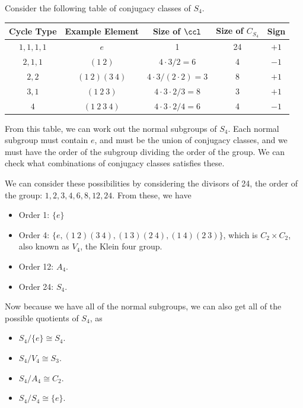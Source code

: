 \documentclass[a4]{scrreprt}
\begin{document}
\begin{example}
	Consider the following table of conjugacy classes of $S_4$.
	\begin{center}
			\begin{tabular}{@{}ccccc@{}}
			\toprule
			Cycle Type & Example Element & Size of $\ccl$ & Size of $C_{S_4}$ & Sign \\ \midrule
			$1, 1, 1, 1$ & $e$   & 1                       &  24           & $+1$    \\
			$2, 1, 1$		& $(1\ 2)$        &     $4 \cdot 3 / 2 = 6$     &        4      &  $-1$    \\ 
			$2, 2$  & $(1\ 2)(3\ 4)$  & $4 \cdot 3 / (2 \cdot 2) = 3$                          &      8        &   $+1$   \\ 
			$3, 1$		   & $(1\ 2\ 3)$               &  $4 \cdot 3 \cdot 2 / 3 = 8$                       &        3      &  $+1$    \\ 
			$4$		   & $(1\ 2\ 3\ 4)$              &    $4 \cdot 3 \cdot 2 / 4 = 6$                     &        4      &  $-1$    \\ 
			\bottomrule
			\end{tabular}
		\end{center}
		From this table, we can work out the normal subgroups of $S_4$. Each normal subgroup must contain $e$, and must be the union of conjugacy classes, and we must have the order of the subgroup dividing the order of the group. We can check what combinations of conjugacy classes satisfies these.

		We can consider these possibilities by considering the divisors of 24, the order of the group: $1, 2, 3, 4, 6, 8, 12, 24$. From these, we have
		\begin{itemize}
			\item Order 1: $\{e\}$
			\item Order 4: $\{e, (1\ 2)(3\ 4), (1\ 3)(2\ 4), (1\ 4)(2\ 3)\}$, which is $C_2 \times C_2$, also known as $V_4$, the Klein four group.
			\item Order 12: $A_4$.
			\item Order 24: $S_4$.
		\end{itemize}

		Now because we have all of the normal subgroups, we can also get all of the possible quotients of $S_4$, as
		\begin{itemize}
			\item $S_4/\{e\} \cong S_4$.
			\item $S_4 / V_4 \cong S_3$.
			\item $S_4/A_4 \cong C_2$.
			\item $S_4 / S_4 \cong \{e\}$.
		\end{itemize}
\end{example}
\end{document}

